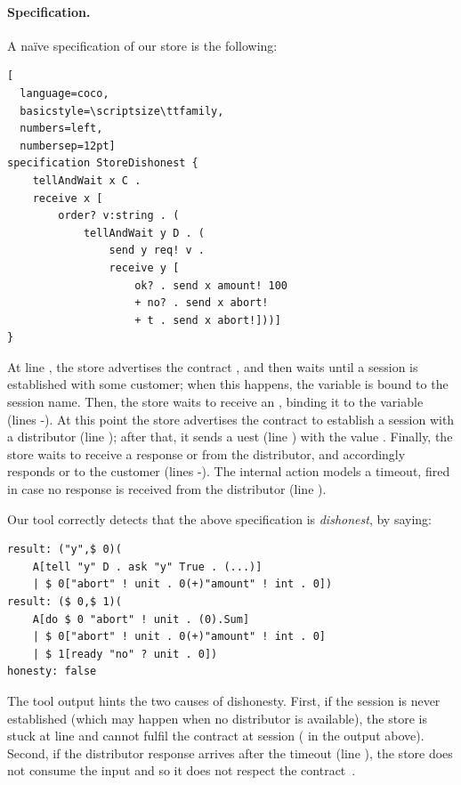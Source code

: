 \paragraph{Specification.}
A naïve \coco specification of our store is the following:
\begin{lstlisting}[
  language=coco,
  basicstyle=\scriptsize\ttfamily,
  numbers=left,
  numbersep=12pt]
specification StoreDishonest {
    tellAndWait x C .
    receive x [
        order? v:string . (
            tellAndWait y D . (
                send y req! v .
                receive y [
                    ok? . send x amount! 100
                    + no? . send x abort!
                    + t . send x abort!]))]
}
\end{lstlisting}

At line , the store advertises the contract ,
and then waits until a session is established with some customer;
when this happens, the variable  is bound to the session name.
Then, the store waits to receive an , 
binding it to the variable  (lines -).
At this point the store advertises the contract 
to establish a session  with a distributor
(line ); 
after that, it sends a uest (line ) with the value .
Finally, the store waits to receive a response  or  from the distributor,
and accordingly responds  or  to the customer 
(lines -). 
The internal action  models a timeout, 
fired in case no response is received from the distributor (line ).

Our tool correctly detects that the above specification is \emph{dishonest}, by saying:
\begin{lstlisting}[basicstyle=\scriptsize\ttfamily]
result: ("y",$ 0)(
    A[tell "y" D . ask "y" True . (...)] 
    | $ 0["abort" ! unit . 0(+)"amount" ! int . 0])
result: ($ 0,$ 1)(
    A[do $ 0 "abort" ! unit . (0).Sum] 
    | $ 0["abort" ! unit . 0(+)"amount" ! int . 0] 
    | $ 1[ready "no" ? unit . 0])
honesty: false
\end{lstlisting}
The tool output hints the two causes of dishonesty. 
First, if the session 
is never established (which may happen when no distributor is available), 
the store is stuck at line 
and cannot fulfil the contract  at session  ( in the output above).
Second, if the distributor response arrives after the timeout (line ),
the store does not consume the input and 
so it does not respect the contract~.

